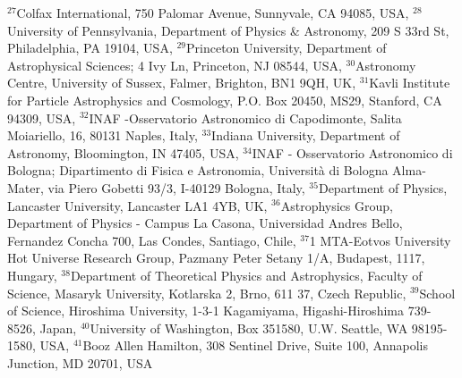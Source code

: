 {$^{27}$Colfax International, 750 Palomar Avenue, Sunnyvale, CA 94085, USA,
$^{28}$University of Pennsylvania, Department of Physics \& Astronomy, 209 S 33rd St, Philadelphia, PA 19104, USA,
$^{29}$Princeton University, Department of Astrophysical Sciences; 4 Ivy Ln, Princeton, NJ 08544, USA,
$^{30}$Astronomy Centre, University of Sussex, Falmer, Brighton, BN1 9QH, UK,
$^{31}$Kavli Institute for Particle Astrophysics and Cosmology, P.O. Box 20450, MS29, Stanford, CA 94309, USA,
$^{32}$INAF -Osservatorio Astronomico di Capodimonte, Salita Moiariello, 16, 80131 Naples, Italy, 
$^{33}$Indiana University, Department of Astronomy, Bloomington, IN 47405, USA,
$^{34}$INAF - Osservatorio Astronomico di Bologna; Dipartimento di Fisica e Astronomia, Universit\`a di Bologna Alma-Mater, via Piero Gobetti 93/3, I-40129 Bologna, Italy,
$^{35}$Department of Physics, Lancaster University, Lancaster LA1 4YB, UK,
$^{36}$Astrophysics Group, Department of Physics - Campus La Casona, Universidad Andres Bello, Fernandez Concha 700, Las Condes,  Santiago, Chile,
$^{37}$1 MTA-Eotvos University Hot Universe Research Group, Pazmany Peter Setany 1/A, Budapest, 1117, Hungary,
$^{38}$Department of Theoretical Physics and Astrophysics, Faculty of Science, Masaryk University, Kotlarska 2, Brno, 611 37, Czech Republic,
$^{39}$School of Science, Hiroshima University, 1-3-1 Kagamiyama, Higashi-Hiroshima 739-8526, Japan,
$^{40}$University of Washington, Box 351580, U.W. Seattle, WA 98195-1580, USA,
$^{41}$Booz Allen Hamilton, 308 Sentinel Drive, Suite 100, Annapolis Junction, MD 20701, USA







}

